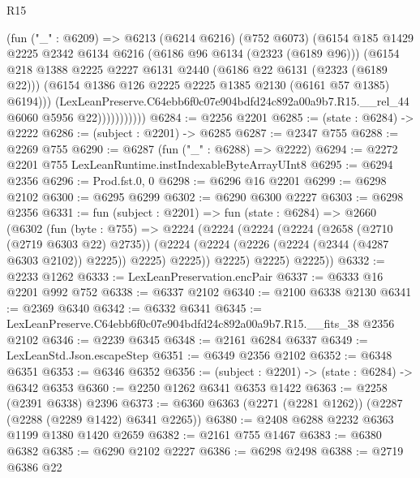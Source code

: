 \begin{lexlean}{R15}
\begin{coremodule}
                      (fun ("_" : @6209) =>
                      @6213
                        (@6214 @6216)
                        (@752 @6073)
                        (@6154
                          @185
                          @1429
                          @2225
                          @2342
                          @6134
                          @6216
                          (@6186 @96 @6134 (@2323 (@6189 @96)))
                          (@6154
                            @218
                            @1388
                            @2225
                            @2227
                            @6131
                            @2440
                            (@6186 @22 @6131 (@2323 (@6189 @22)))
                            (@6154 @1386 @126 @2225 @2225 @1385 @2130 (@6161 @57 @1385) @6194)))
                        (LexLeanPreserve.C64ebb6f0c07e904bdfd24c892a00a9b7.R15.__rel_44
                          @6060
                          @5956
                          @22)))))))))))
@6284 := @2256 @2201
@6285 := (state : @6284) -> @2222
@6286 := (subject : @2201) -> @6285
@6287 := @2347 @755
@6288 := @2269 @755
@6290 := @6287 (fun ("_" : @6288) => @2222)
@6294 := @2272 @2201 @755 LexLeanRuntime.instIndexableByteArrayUInt8
@6295 := @6294 @2356
@6296 := Prod.fst.{0, 0}
@6298 := @6296 @16 @2201
@6299 := @6298 @2102
@6300 := @6295 @6299
@6302 := @6290 @6300 @2227
@6303 := @6298 @2356
@6331 := fun (subject : @2201) =>
  fun (state : @6284) =>
  @2660
    (@6302
      (fun (byte : @755) =>
      @2224
        (@2224
          (@2224
            (@2224
              (@2658 (@2710 (@2719 @6303 @22) @2735))
              (@2224 (@2224 (@2226 (@2224 (@2344 (@4287 @6303 @2102)) @2225)) @2225) @2225))
            @2225)
          @2225)
        @2225))
@6332 := @2233 @1262
@6333 := LexLeanPreservation.encPair
@6337 := @6333 @16 @2201 @992 @752
@6338 := @6337 @2102
@6340 := @2100 @6338 @2130
@6341 := @2369 @6340
@6342 := @6332 @6341
@6345 := LexLeanPreserve.C64ebb6f0c07e904bdfd24c892a00a9b7.R15.__fits_38 @2356 @2102
@6346 := @2239 @6345
@6348 := @2161 @6284 @6337
@6349 := LexLeanStd.Json.escapeStep
@6351 := @6349 @2356 @2102
@6352 := @6348 @6351
@6353 := @6346 @6352
@6356 := (subject : @2201) -> (state : @6284) -> @6342 @6353
@6360 := @2250 @1262 @6341 @6353 @1422
@6363 := @2258 (@2391 @6338) @2396
@6373 := @6360 @6363 (@2271 (@2281 @1262)) (@2287 (@2288 (@2289 @1422) @6341 @2265))
@6380 := @2408 @6288 @2232 @6363 @1199 @1380 @1420 @2659
@6382 := @2161 @755 @1467
@6383 := @6380 @6382
@6385 := @6290 @2102 @2227
@6386 := @6298 @2498
@6388 := @2719 @6386 @22

\end{coremodule}
\end{lexlean}
